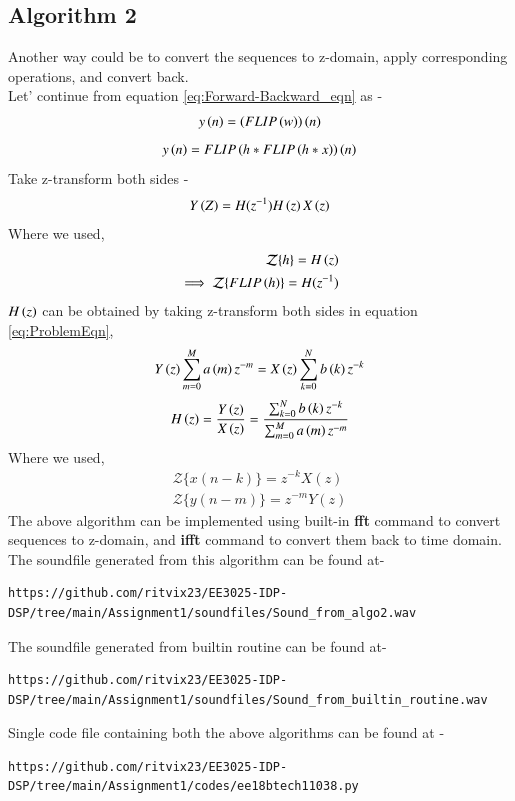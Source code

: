\documentclass[journal,12pt,twocolumn]{IEEEtran}
\begin{document}
  \subsection{Algorithm 2}
  Another way could be to convert the sequences to z-domain, apply corresponding operations, and convert back.
  \\
  Let' continue from equation \ref{eq:Forward-Backward_eqn} as - 
  \begin{align}
    y\left(n\right)=\left(FLIP\left(w\right)\right)\left(n\right)
  \end{align}
  \begin{align}
    y\left(n\right)=FLIP\left(h*FLIP\left(h*x\right)\right)\left(n\right)
  \end{align}
  Take z-transform both sides - 
  \begin{align} \label{eq: z_relation}
    Y\brak{Z}=H(z^{-1})H\brak{z}X\brak{z}
  \end{align}
  Where we used, 
  \begin{align}
        {\mathcal{Z}}\{h\} = H\left(z\right) \\
      \implies{\mathcal{Z}}\{FLIP\left(h\right)\} = H(z^{-1})
  \end{align}
  $H\left(z\right)$ can be obtained by taking z-transform both sides in equation \ref{eq:ProblemEqn}, 
  \begin{align}
     Y\left(z\right) \sum _{m=0}^{M}a\left(m\right) z^{-m} = X\left(z\right) \sum _{k=0}^{N}b\left(k\right)z^{-k}
\end{align}
\begin{align}
\label{eq:Hz_eqn}
    H\brak{z} = \frac{Y\brak{z}}{X\brak{z}} = \frac{\sum _{k=0}^{N}b\brak{k} z^{-k}}{\sum _{m=0}^{M}a\brak{m}z^{-m}}
\end{align} 
 Where we used,
  \begin{align}
      {\mathcal {Z}}\{x(n-k)\} = z^{-k}X(z) \\
      {\mathcal {Z}}\{y(n-m)\} = z^{-m}Y(z)
  \end{align}
 The above algorithm can be implemented using built-in \textbf{fft} command to convert sequences to z-domain, and \textbf{ifft} command to convert them back to time domain.
 \\
 The soundfile generated from this algorithm can be found at- 
 \begin{lstlisting}
https://github.com/ritvix23/EE3025-IDP-DSP/tree/main/Assignment1/soundfiles/Sound_from_algo2.wav
 \end{lstlisting}
 The soundfile generated from builtin routine can be found at- 
 \begin{lstlisting}
https://github.com/ritvix23/EE3025-IDP-DSP/tree/main/Assignment1/soundfiles/Sound_from_builtin_routine.wav
 \end{lstlisting}
 Single code file containing both the above algorithms can be found at - 
 \begin{lstlisting}
https://github.com/ritvix23/EE3025-IDP-DSP/tree/main/Assignment1/codes/ee18btech11038.py
 \end{lstlisting}
 
\end{document}
